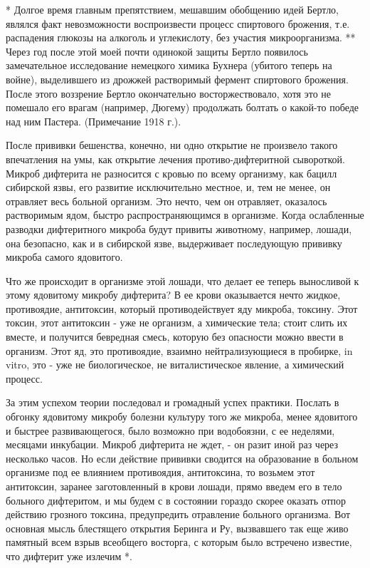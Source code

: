 * Долгое время главным препятствием, мешавшим обобщению идей Бертло,
являлся факт невозможности воспроизвести процесс спиртового брожения,
т.е. распадения глюкозы на алкоголь и углекислоту, без участия
микроорганизма.
** Через год после этой моей почти одинокой защиты Бертло появилось
замечательное исследование немецкого химика Бухнера (убитого теперь на
войне), выделившего из дрожжей растворимый фермент спиртового
брожения. После этого воззрение Бертло окончательно восторжествовало,
хотя это не помешало его врагам (например, Дюгему) продолжать болтать
о какой-то победе над ним Пастера. (Примечание 1918 г.).

После прививки бешенства, конечно, ни одно открытие не произвело  такого
впечатления на умы, как открытие лечения противо-дифтеритной сывороткой.
Микроб дифтерита не разносится с  кровью по всему организму, как  бацилл
сибирской язвы, его развитие исключительно местное, и, тем не менее,  он
отравляет весь больной организм. Это нечто, чем он отравляет,  оказалось
растворимым  ядом,   быстро   распространяющимся  в   организме.   Когда
ослабленные  разводки  дифтеритного  микроба  будут  привиты  животному,
например, лошади, она  безопасно, как  и в  сибирской язве,  выдерживает
последующую прививку микроба самого ядовитого.

Что же  происходит  в  организме  этой  лошади,  что  делает  ее  теперь
выносливой к этому ядовитому микробу  дифтерита? В ее крови  оказывается
нечто жидкое,  противоядие,  антитоксин,  который  противодействует  яду
микроба, токсину.  Этот токсин,  этот антитоксин  - уже  не организм,  а
химические тела; стоит  слить их  вместе, и  получится бевредная  смесь,
которую без опасности можно ввести в организм. Этот яд, это противоядие,
взаимно  нейтрализующиеся  в   пробирке,  in   vitro,  это   -  уже   не
биологическое, не виталистическое явление, а химический процесс.

За этим успехом теории последовал и громадный успех практики. Послать  в
обгонку ядовитому  микробу  болезни  культуру  того  же  микроба,  менее
ядовитого и быстрее развивающегося, было  возможно при водобоязни, с  ее
неделями, месяцами инкубации. Микроб дифтерита не ждет, - он разит  иной
раз через  несколько  часов.  Но  если  действие  прививки  сводится  на
образование  в   больном   организме  под   ее   влиянием   противоядия,
антитоксина, то возьмем этот  антитоксин, заранее заготовленный в  крови
лошади, прямо введем  его в  тело больного дифтеритом,  и мы  будем с  в
состоянии  гораздо  скорее  оказать  отпор  действию  грозного  токсина,
предупредить  отравление   больного   организма.  Вот   основная   мысль
блестящего открытия Беринга и Ру, вызвавшего так еще живо памятный  всем
взрыв  всеобщего  восторга,  с  которым  было  встречено  известие,  что
дифтерит уже излечим *.

